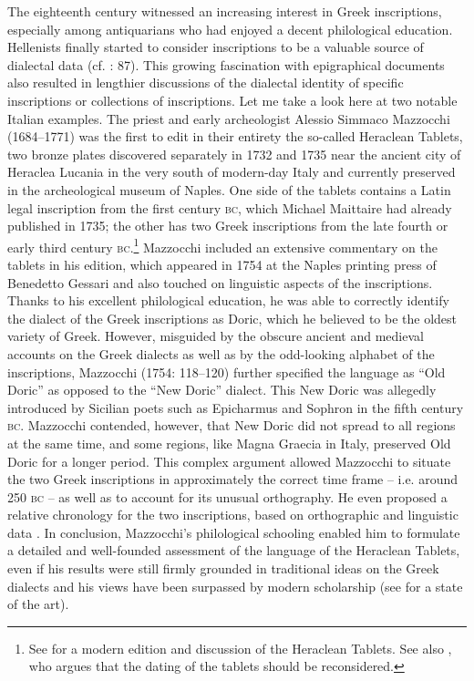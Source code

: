 \documentclass[output=paper]{langsci/langscibook}
\begin{document}
The eighteenth century witnessed an increasing interest in Greek inscriptions, especially among antiquarians who had enjoyed a decent philological education. Hellenists finally started to consider inscriptions to be a valuable source of dialectal data (cf. \citealt{Walch1772}: 87). This growing fascination with epigraphical documents also resulted in lengthier discussions of the dialectal identity of specific inscriptions or collections of inscriptions. Let me take a look here at two notable Italian examples. The priest and early archeologist Alessio Simmaco Mazzocchi (1684–1771) was the first to edit in their entirety the so-called Heraclean Tablets, two bronze plates discovered separately in 1732 and 1735 near the ancient city of Heraclea Lucania in the very south of modern-day Italy and currently preserved in the archeological museum of Naples. One side of the tablets contains a Latin legal inscription from the first century \textsc{bc}, which Michael Maittaire had already published in 1735; the other has two Greek inscriptions from the late fourth or early third century \textsc{bc}.\footnote{See \citet{UguzzoniGhinatti1968} for a modern edition and discussion of the Heraclean Tablets. See also \citet{Weiss2016}, who argues that the dating of the tablets should be reconsidered.} Mazzocchi included an extensive commentary on the tablets in his edition, which appeared in 1754 at the Naples printing press of Benedetto Gessari and also touched on linguistic aspects of the inscriptions. Thanks to his excellent philological education, he was able to correctly identify the dialect of the Greek inscriptions as Doric, which he believed to be the oldest variety of Greek. However, misguided by the obscure ancient and medieval accounts on the Greek dialects as well as by the odd-looking alphabet of the inscriptions, Mazzocchi (1754: 118–120) further specified the language as “Old Doric” as opposed to the “New Doric” dialect. This New Doric was allegedly introduced by Sicilian poets such as Epicharmus and Sophron in the fifth century \textsc{bc}. Mazzocchi contended, however, that New Doric did not spread to all regions at the same time, and some regions, like Magna Graecia in Italy, preserved Old Doric for a longer period. This complex argument allowed Mazzocchi to situate the two Greek inscriptions in approximately the correct time frame – i.e. around 250 \textsc{bc} – as well as to account for its unusual orthography. He even proposed a relative chronology for the two inscriptions, based on orthographic and linguistic data \citep[135]{Mazzocchi1754}. In conclusion, Mazzocchi’s philological schooling enabled him to formulate a detailed and well-founded assessment of the language of the Heraclean Tablets, even if his results were still firmly grounded in traditional ideas on the Greek dialects and his views have been surpassed by modern scholarship (see \citealt{Weiss2016} for a state of the art).
\end{document}
